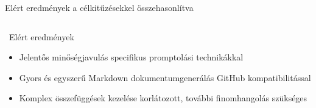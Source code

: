 \documentclass[11pt]{beamer}
\begin{document}
\begin{frame}{Elért eredmények a célkitűzésekkel összehasonlítva}
\begin{columns}[T]
\begin{block}{\faCheckCircle~Elért eredmények}
\begin{itemize}
            \vspace{0.5em}
            \item Jelentős minőségjavulás specifikus promptolási technikákkal
            \vspace{0.5em}
            \item Gyors és egyszerű Markdown dokumentumgenerálás GitHub kompatibilitással
            \vspace{0.5em}
            \item Komplex összefüggések kezelése korlátozott, további finomhangolás szükséges
            \vspace{0.5em}
          \end{itemize}
        \end{block}
    \end{columns}
\end{frame}
\end{document}
